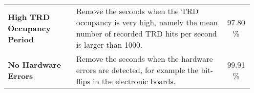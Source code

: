 \begin{table}[tp]
\begin{tabular}{l p{7.5cm}  c}
\textbf{High TRD Occupancy Period}  & Remove the seconds when the TRD occupancy is very high, namely the mean number of recorded TRD hits per second is larger than 1000.                             & 97.80   \%  \\
\textbf{No Hardware Errors}                & Remove the seconds when the hardware errors are detected, for example the bit-flips in the electronic boards.      & 99.91   \% \\
\hline
\end{tabular}
\end{table}


\begin{comment}  	
Bad Runs 
2. Nominal data taking period
The AMS-02 collaboration keeps track of time intervals in which the detector was in an unstable condition, such as the first weeks of commissioning, all periods where the TRD gas system is refilled, when the DAQ was unavailable, etc. These so-called “bad runs” are excluded when analyzing the ISS data.

Bad Reconstruction Period 
1. Nominal reconstruction period
The ratio of reconstructed particles over the trigger rate in each second should be nominal.
Figure A.1 shows a plot of the trigger rate as function of the ratio: reconstructed particles over
the trigger rate. The red dashed line y = 1600 · x separates the nominal reconstruction period 0.07
from the non-nominal reconstruction period, where the reconstruction efficiency is low. All entries left of the line are rejected for further analysis.

Bad Facing Angle
4. Nominal ISS zenith angle
The zenith angle of the ISS must be less than 40°. Periods when the ISS was rotated must be excluded for analysis.

No Missed Events 
5. No missed events
If there are more than 10 \% of the events missing in a second, exclude the second for analysis. 
There are rare reasons that can lead to missing events, for instance transfer problems in the DAQ boards, or buffer overflows on the data reduction boards.

Bad Live Time
8. Nominal live-time
If the detector was busy for more than 50 \% in a second, reject the time period.

Too Many Events In Second
7. Too many events in second
If the amount of reconstructed events exceeds 1800 in a second, reject the time period. Events in these conditions are mostly taken near the SAA [Kurnosova1962] or in the pole regions, where the detector is filled with low energy particles. These periods should be rejected.


\end{comment}
